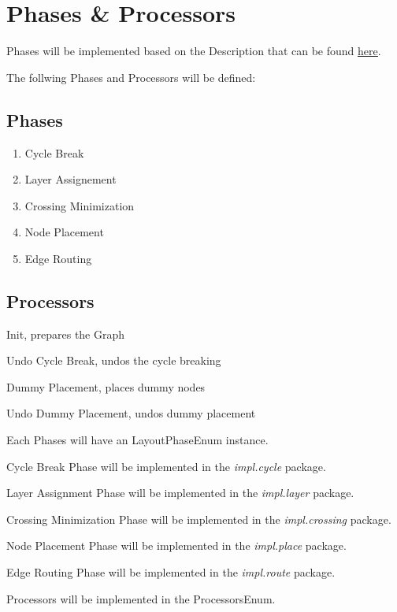 \section{Phases \& Processors}

Phases will be implemented based on the Description that can be found \underline{
\href{https://www.eclipse.org/elk/documentation/algorithmdevelopers/algorithmimplementation/algorithmstructure.html}{here}}.

The follwing Phases and Processors will be defined:

\subsection{Phases}
\begin{enumerate}
\item Cycle Break
\item Layer Assignement
\item Crossing Minimization
\item Node Placement
\item Edge Routing
\end{enumerate}

\subsection{Processors}
\begin{list}{-}{}
\item Init, prepares the Graph
\item Undo Cycle Break, undos the cycle breaking
\item Dummy Placement, places dummy nodes
\item Undo Dummy Placement, undos dummy placement
\end{list}

Each Phases will have an LayoutPhaseEnum instance.

Cycle Break Phase will be implemented in the \textit{impl.cycle} package.

Layer Assignment Phase will be implemented in the \textit{impl.layer} package.

Crossing Minimization Phase will be implemented in the \textit{impl.crossing} package.

Node Placement Phase will be implemented in the \textit{impl.place} package.

Edge Routing Phase will be implemented in the \textit{impl.route} package.

Processors will be implemented in the ProcessorsEnum.


